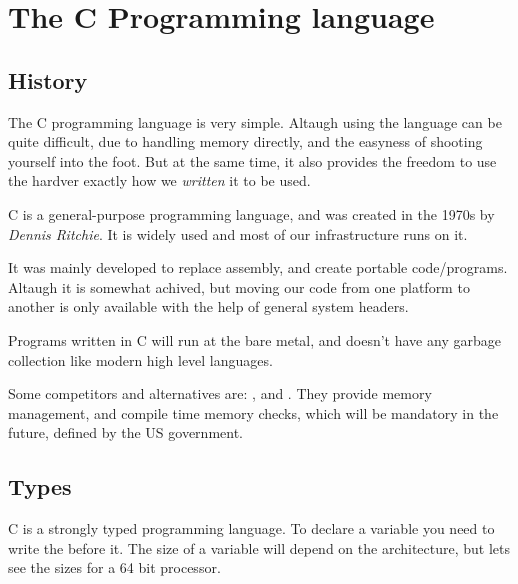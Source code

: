 \section{The C Programming language}

\subsection{History}
The C programming language is very simple.
Altaugh using the language can be quite difficult, due to handling memory directly, and the easyness of shooting
yourself into the foot.
But at the same time, it also provides the freedom to use the hardver exactly how we \textit{written} it to be used.

\vspace{.5em}
C is a general-purpose programming language, and was created in the 1970s by \textit{Dennis Ritchie}. %
It is widely used and most of our infrastructure runs on it.

It was mainly developed to replace assembly, and create portable code/programs.
Altaugh it is somewhat achived, but moving our code from one platform to another is only available with the help of
general system headers.

Programs written in C will run at the bare metal, and doesn't have any garbage collection like modern high level
languages.

Some competitors and alternatives are: ,  and .
They provide memory management, and compile time memory checks, which will be mandatory in the future, defined by the
US government. %


\subsection{Types}
C is a strongly typed programming language.
To declare a variable you need to write the  before it.
The size of a variable will depend on the architecture, but lets see the sizes for a 64 bit processor.

